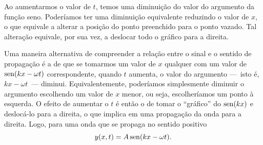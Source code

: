 \begin{marginfigure}[2cm]
\centering
{}
\caption{Ao aumentarmos o valor de $t$, temos uma diminuição do valor do argumento da função seno. Poderíamos ter uma diminuição equivalente reduzindo o valor de $x$, o que equivale a alterar a posição do ponto preenchido para o ponto vazado. Tal alteração equivale, por sua vez, a deslocar todo o gráfico para a direita.}
\end{marginfigure}

Uma maneira alternativa de compreender a relação entre o sinal e o sentido de propagação é a de que se tomarmos um valor de $x$ qualquer com um valor de $\operatorname{sen}(kx-\omega t)$ correspondente, quando $t$ aumenta, o valor do argumento ---~isto é, $kx -\omega t$~--- diminui. Equivalentemente, poderíamos simplesmente diminuir o argumento escolhendo um valor de $x$ menor, ou seja, escolheríamos um ponto à esquerda. O efeito de aumentar o $t$ é então o de tomar o ``gráfico'' do $\operatorname{sen}(kx)$ e deslocá-lo para a direita, o que implica em uma propagação da onda para a direita. Logo, para uma onda que se propaga no sentido positivo
\begin{equation}
    y(x,t) = A\operatorname{sen}(kx -\omega t).
\end{equation}

